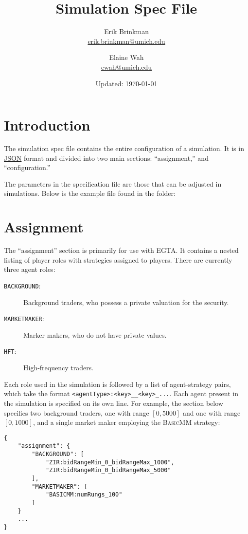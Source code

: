 \documentclass[11pt]{article}
\begin{document}
	
\title{Simulation Spec File}
\author{
  Erik Brinkman \\
  \href{mailto:erik.brinkman@umich.edu}{erik.brinkman@umich.edu}
  \and
  Elaine Wah \\
  \href{mailto:ewah@umich.edu}{ewah@umich.edu}
}
\date{Updated: \today}
\maketitle

\section{Introduction}

The simulation spec file contains the entire configuration of a simulation. It
is in \href{https://en.wikipedia.org/wiki/Json}{JSON} format and divided into
two main sections: ``assignment,'' and ``configuration.''

The parameters in the specification file are those that can be adjusted in
simulations. Below is the example  file found in
the  folder:



\section{Assignment}

The ``assignment'' section is primarily for use with EGTA. It contains a
nested listing of player roles with strategies assigned to players. 
%
There are currently three agent roles:
 \begin{description}
  \item[\texttt{BACKGROUND}:] Background traders, who possess a private valuation for the security.
  \item[\texttt{MARKETMAKER}:] Marker makers, who do not have private values.
  \item[\texttt{HFT}:] High-frequency traders.
  \end{description}

Each role used in the simulation is followed by a list of agent-strategy pairs, which take the format \texttt{<agentType>:<key>\_<value1>\_<key>\_<value2>...}. Each agent present in the simulation is specified on its own line.
%
For example, the section below specifies two background traders, one with range $[0, 5000]$ and one with range $[0, 1000]$, and a single market maker employing the \textsc{BasicMM} strategy:
%
\begin{lstlisting}
{
    "assignment": {
        "BACKGROUND": [
            "ZIR:bidRangeMin_0_bidRangeMax_1000",
            "ZIR:bidRangeMin_0_bidRangeMax_5000"
        ],
        "MARKETMAKER": [
            "BASICMM:numRungs_100"
        ]
    }
    ...
}
\end{lstlisting}
\end{document}
